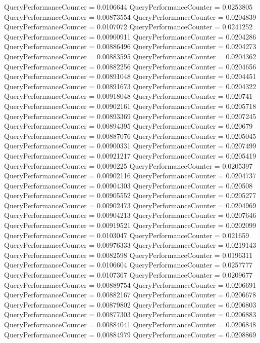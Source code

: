 \documentclass[9pt]{article}
\theoremstyle{plain}
\theoremstyle{definition}
\theoremstyle{remark}
\numberwithin{equation}{section}
\begin{document}
QueryPerformanceCounter  =  0.0106644
QueryPerformanceCounter  =  0.0253805
QueryPerformanceCounter  =  0.00873554
QueryPerformanceCounter  =  0.0204839
QueryPerformanceCounter  =  0.0107072
QueryPerformanceCounter  =  0.0241252
QueryPerformanceCounter  =  0.00900911
QueryPerformanceCounter  =  0.0204286
QueryPerformanceCounter  =  0.00886496
QueryPerformanceCounter  =  0.0204273
QueryPerformanceCounter  =  0.00883595
QueryPerformanceCounter  =  0.0204362
QueryPerformanceCounter  =  0.00882256
QueryPerformanceCounter  =  0.0204656
QueryPerformanceCounter  =  0.00891048
QueryPerformanceCounter  =  0.0204451
QueryPerformanceCounter  =  0.00891673
QueryPerformanceCounter  =  0.0204322
QueryPerformanceCounter  =  0.00918048
QueryPerformanceCounter  =  0.020741
QueryPerformanceCounter  =  0.00902161
QueryPerformanceCounter  =  0.0205718
QueryPerformanceCounter  =  0.00893369
QueryPerformanceCounter  =  0.0207245
QueryPerformanceCounter  =  0.00894395
QueryPerformanceCounter  =  0.020679
QueryPerformanceCounter  =  0.00887076
QueryPerformanceCounter  =  0.0205045
QueryPerformanceCounter  =  0.00900331
QueryPerformanceCounter  =  0.0207499
QueryPerformanceCounter  =  0.00921217
QueryPerformanceCounter  =  0.0205419
QueryPerformanceCounter  =  0.0090225
QueryPerformanceCounter  =  0.0205397
QueryPerformanceCounter  =  0.00902116
QueryPerformanceCounter  =  0.0204737
QueryPerformanceCounter  =  0.00904303
QueryPerformanceCounter  =  0.020508
QueryPerformanceCounter  =  0.00905552
QueryPerformanceCounter  =  0.0205277
QueryPerformanceCounter  =  0.00902473
QueryPerformanceCounter  =  0.0204969
QueryPerformanceCounter  =  0.00904213
QueryPerformanceCounter  =  0.0207646
QueryPerformanceCounter  =  0.00919521
QueryPerformanceCounter  =  0.0202099
QueryPerformanceCounter  =  0.0103047
QueryPerformanceCounter  =  0.021659
QueryPerformanceCounter  =  0.00976333
QueryPerformanceCounter  =  0.0219143
QueryPerformanceCounter  =  0.0082598
QueryPerformanceCounter  =  0.0196311
QueryPerformanceCounter  =  0.0106604
QueryPerformanceCounter  =  0.0257777
QueryPerformanceCounter  =  0.0107367
QueryPerformanceCounter  =  0.0209677
QueryPerformanceCounter  =  0.00889754
QueryPerformanceCounter  =  0.0206691
QueryPerformanceCounter  =  0.00882167
QueryPerformanceCounter  =  0.0206678
QueryPerformanceCounter  =  0.00879802
QueryPerformanceCounter  =  0.0206803
QueryPerformanceCounter  =  0.00877303
QueryPerformanceCounter  =  0.0206883
QueryPerformanceCounter  =  0.00884041
QueryPerformanceCounter  =  0.0206848
QueryPerformanceCounter  =  0.00884979
QueryPerformanceCounter  =  0.0208869
\end{document}
